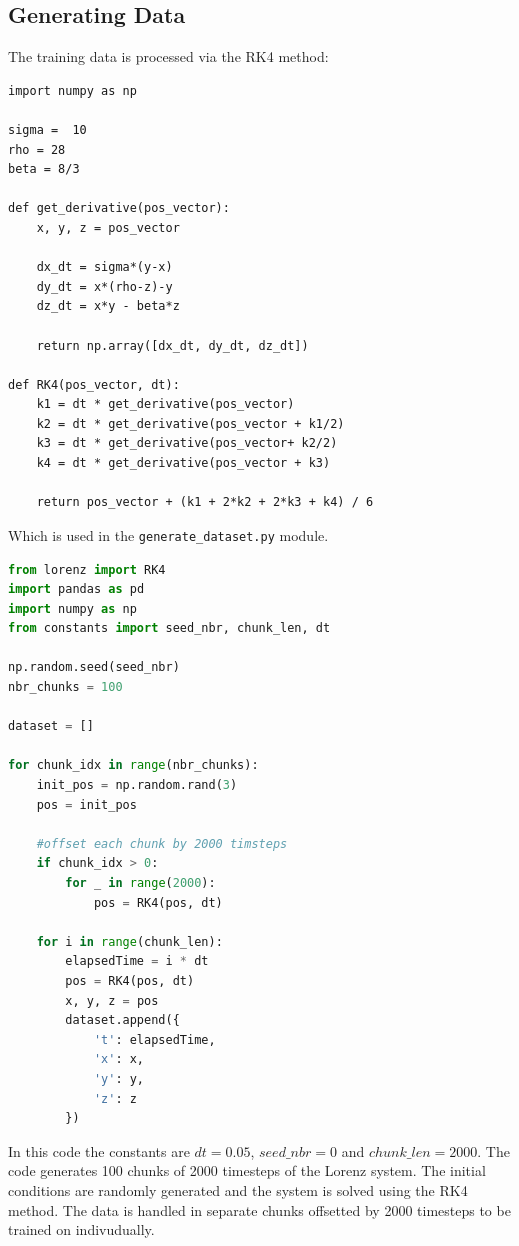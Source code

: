 \documentclass[11pt]{article}
\begin{document}
\subsection{Generating Data}

The training data is processed via the RK4 method:

\begin{lstlisting}
import numpy as np

sigma =  10
rho = 28
beta = 8/3

def get_derivative(pos_vector):
    x, y, z = pos_vector

    dx_dt = sigma*(y-x)
    dy_dt = x*(rho-z)-y
    dz_dt = x*y - beta*z

    return np.array([dx_dt, dy_dt, dz_dt])

def RK4(pos_vector, dt):
    k1 = dt * get_derivative(pos_vector)
    k2 = dt * get_derivative(pos_vector + k1/2)
    k3 = dt * get_derivative(pos_vector+ k2/2)
    k4 = dt * get_derivative(pos_vector + k3)

    return pos_vector + (k1 + 2*k2 + 2*k3 + k4) / 6
\end{lstlisting}


Which is used in the \texttt{generate\_dataset.py} module.

\begin{lstlisting}[language=Python]
from lorenz import RK4  
import pandas as pd
import numpy as np
from constants import seed_nbr, chunk_len, dt

np.random.seed(seed_nbr)
nbr_chunks = 100

dataset = []

for chunk_idx in range(nbr_chunks):
    init_pos = np.random.rand(3)
    pos = init_pos

    #offset each chunk by 2000 timsteps
    if chunk_idx > 0:
        for _ in range(2000):
            pos = RK4(pos, dt)
    
    for i in range(chunk_len):
        elapsedTime = i * dt
        pos = RK4(pos, dt)
        x, y, z = pos
        dataset.append({
            't': elapsedTime,
            'x': x,
            'y': y,
            'z': z
        })
\end{lstlisting}

In this code the constants are $dt = 0.05$, $seed\_nbr = 0$ and $chunk\_len = 2000$. The code generates 100 chunks of 2000 timesteps of the Lorenz system. The initial conditions are randomly generated and the system is solved using the RK4 method. The data is handled in separate chunks offsetted by 2000 timesteps to be trained on indivudually. 
\end{document}
